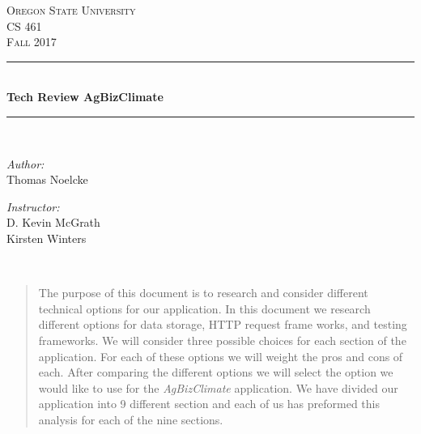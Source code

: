 \documentclass[onecolumn, draftclsnofoot,10pt, compsoc]{article}
\begin{document}
    \begin{titlepage}
    \newcommand{\HRule}{\rule{\linewidth}{0.5mm}}
    \center
    \textsc{\Large Oregon State University}\\[1.5cm]
    \textsc{\Large CS 461}\\[0.5cm]
    \textsc{\Large Fall 2017}\\[0.5cm]
    \HRule \\[0.4cm]
    { \huge \bfseries Tech Review AgBizClimate\textcopyright}\\[0.4cm] %
    \HRule \\[1.5cm]
    \begin{minipage}{0.4\textwidth}
        \begin{flushleft} \large
        \emph{Author:}\\
        Thomas Noelcke
        \end{flushleft}
    \end{minipage}
    \begin{minipage}{0.4\textwidth}
        \begin{flushright} \large
        \emph{Instructor:} \\
        D. Kevin McGrath\\
        Kirsten Winters
        \end{flushright}
    \end{minipage}\\[2cm]
    \begin{abstract}
    \item 
		The purpose of this document is to research and consider different technical options for our application. In this document we research different options for data storage, HTTP request frame works, and testing frameworks. We will consider three possible choices for each section of the application. For each of these options we will weight the pros and cons of each. After comparing the different options we will select the option we would like to use for the \textit{AgBizClimate} application. We have divided our application into 9 different section and each of us has preformed this analysis for each of the nine sections.
    \end{abstract}
    \vfill %
    \end{titlepage}
		\newpage
		\tableofcontents
		\newpage
		\clearpage
		
		
		
		
		
		
\end{document}
